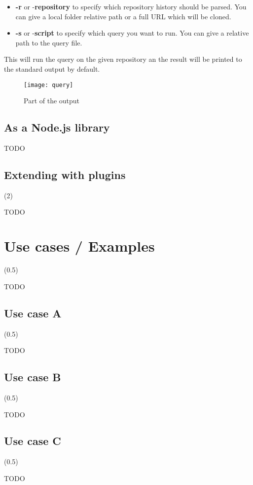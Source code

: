\begin{itemize}
	\item \textbf{-r} or -\textbf{repository} to specify which repository history should be parsed. You can give a local folder relative path or a full URL which will be cloned.
	\item \textbf{-s} or -\textbf{script} to specify which query you want to run. You can give a relative path to the query file.
\end{itemize}

This will run the query on the given repository an the result will be printed to the standard output by default.

\begin{figure}[H]
	\centering
	\texttt{[image: query]}
	\caption{Part of the output}
	\label{fig:fig-query}
\end{figure}


\subsection{As a Node.js library}

TODO

\subsection{Extending with plugins} (2)

TODO

\section{Use cases / Examples} (0.5)

TODO

\subsection{Use case A} (0.5)

TODO

\subsection{Use case B} (0.5)

TODO

\subsection{Use case C} (0.5)

TODO

